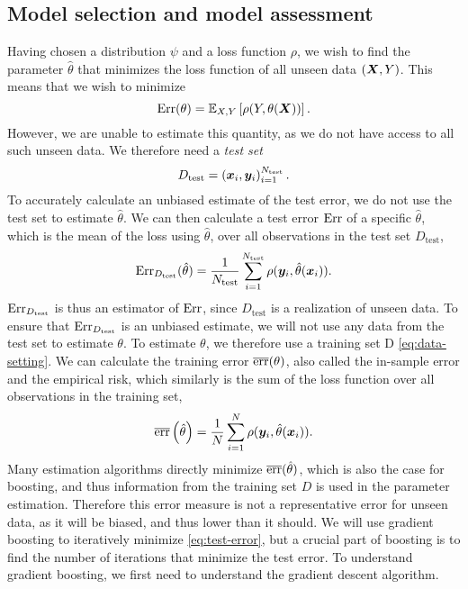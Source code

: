 \subsection{Model selection and model assessment}
Having chosen a distribution $\psi$ and a loss function $\rho$, we wish to find the parameter $\hat{\theta}$ that minimizes the loss function of all unseen data $\left(\bm{X},Y\right)$.
This means that we wish to minimize
\begin{equation}\label{eq:unseen-error}
    \text{Err}(\theta)=\mathbb{E}_{X,Y}\left[\rho(Y,\theta(\bm{X}))\right].
\end{equation}
However, we are unable to estimate this quantity, as we do not have access to all such unseen data.
We therefore need a \textit{test set}
\begin{equation*}
    D_{\text{test}}=\left(\bm{x}_i,\bm{y}_i\right)_{i=1}^{N_{\text{test}}}.
\end{equation*}
To accurately calculate an unbiased estimate of the test error, we do not use the test set to estimate $\hat{\theta}$.
We can then calculate a test error $\text{Err}$ of a specific $\hat{\theta}$, which is the mean of the loss using $\hat{\theta}$, over all observations in the test set $D_{\text{test}}$,
\begin{equation}\label{eq:test-error}
    \text{Err}_{D_{\text{test}}}(\hat{\theta})=\frac{1}{N_{\text{test}}}\sum_{i=1}^{N_{\text{test}}} \rho(\bm{y}_i,\hat{\theta}(\bm{x}_i)).
\end{equation}
$\text{Err}_{D_{\text{test}}}$ is thus an estimator of $\text{Err}$, since $D_{\text{test}}$ is a realization of unseen data.
To ensure that $\text{Err}_{D_{\text{test}}}$ is an unbiased estimate, we will not use any data from the test set to estimate $\theta$.
To estimate $\theta$, we therefore use a training set D \ref{eq:data-setting}.
We can calculate the training error $\overline{\text{err}}(\theta)$, also called the in-sample error and the empirical risk, which similarly is the sum of the loss function over all observations in the training set,
\begin{equation*}
    \overline{\text{err}}\left(\hat{\theta}\right)=\frac{1}{N}\sum_{i=1}^{N} \rho(\bm{y}_i,\hat{\theta}(\bm{x}_i)).
\end{equation*}
Many estimation algorithms directly minimize $\overline{\text{err}}(\hat{\theta})$, which is also the case for boosting, and thus information from the training set $D$ is used in the parameter estimation.
Therefore this error measure is not a representative error for unseen data, as it will be biased, and thus lower than it should.
We will use gradient boosting to iteratively minimize \ref{eq:test-error}, but a crucial part of boosting is to find the number of iterations that minimize the test error.
To understand gradient boosting, we first need to understand the gradient descent algorithm.

